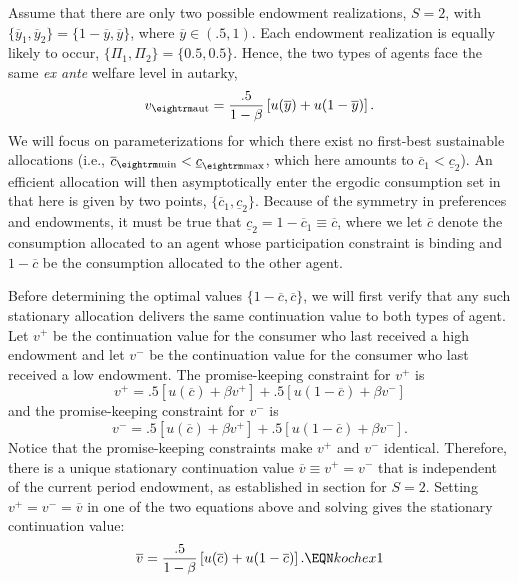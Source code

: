 Assume that there are only two possible endowment realizations,
$S=2$, with $\{\overline y_1, \overline y_2\}=\{1-\overline y,
\overline y\}$, where $\overline y \in (.5,1)$. Each endowment
realization is equally likely to occur, $\{\Pi_1, \Pi_2\}=\{0.5,
0.5\}$. Hence, the two types of agents face the same {\it ex ante}
welfare level in autarky,
$$v_{\rm aut} = {.5 \over 1-\beta}\left[ u(\overline y) +
  u(1-\overline y)\right].
$$
We will focus on parameterizations for which there exist no
first-best sustainable allocations (i.e., $\overline c_{\rm min} <
\underline c_{\rm max}$, which here amounts to $\overline c_1 <
\underline c_2$). An efficient allocation will then asymptotically
enter the ergodic consumption set in  that here is
given by two points, $\{\overline c_1, \underline c_2\}$. Because
of the symmetry in preferences and endowments, it must be true
that $\underline c_2 = 1 - \overline c_1 \equiv \overline c$,
where we let $\overline c$ denote the consumption allocated to an
agent whose participation constraint is binding and $1 -\overline
c$ be the consumption allocated to the other agent.

Before determining the optimal values $\{1-\overline c, \overline
c\}$, we will first verify that any such stationary allocation
delivers the same continuation value to both types of agent. Let
$v^+$ be the continuation value for the consumer who last received
a high endowment and let $v^-$ be the continuation value for the
consumer who last received a low endowment. The promise-keeping
constraint for $v^+$ is
$$v^+ = .5[u(\overline c) + \beta v^+] +
  .5[u(1-\overline c) + \beta v^- ]  $$
and  the promise-keeping constraint for
$v^-$ is
$$v^- = .5[u(\overline c) + \beta v^+] +
  .5[u(1-\overline c) + \beta v^- ].
$$
Notice that the promise-keeping constraints make  $v^+$ and
$v^-$  identical.
Therefore, there is a unique
stationary continuation value $\overline v \equiv v^+ =v^-$ that is independent
of the current period endowment, as established in section
 for $S=2$.
  Setting $v^+ = v^- = \overline v$
 in one of the two equations above
and solving gives the stationary continuation value:
$$ \overline v = {.5\over 1-\beta}
\left[u(\overline c) + u(1-\overline c)\right].  \EQN kochex1  $$


